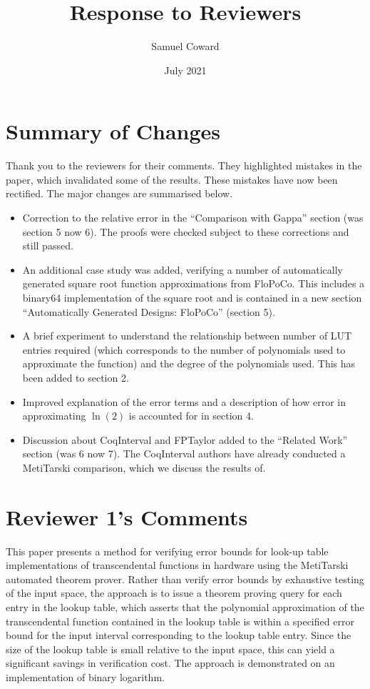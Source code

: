 \documentclass{article}
\title{Response to Reviewers}
\author{Samuel Coward }
\date{July 2021}
\begin{document}
\maketitle

\section*{Summary of Changes}
Thank you to the reviewers for their comments. They highlighted mistakes in the paper, which invalidated some of the results. These mistakes have now been rectified. The major changes are summarised below.

\begin{itemize}
    \item Correction to the relative error in the ``Comparison with Gappa'' section (was section 5 now 6). The proofs were checked subject to these corrections and still passed.
    \item An additional case study was added, verifying a number of automatically generated square root function approximations from FloPoCo. This includes a binary64 implementation of the square root and is contained in a new section ``Automatically Generated Designs: FloPoCo'' (section 5).
    \item A brief experiment to understand the relationship between number of LUT entries required (which corresponds to the number of polynomials used to approximate the function) and the degree of the polynomials used. This has been added to section 2.
    \item Improved explanation of the error terms and a description of how error in approximating $\ln(2)$ is accounted for in section 4. 
    \item Discussion about CoqInterval and FPTaylor added to the ``Related Work'' section (was 6 now 7). The CoqInterval authors have already conducted a MetiTarski comparison, which we discuss the results of.  
\end{itemize} 

\section*{Reviewer 1's Comments}
This paper presents a method for verifying error bounds for look-up table implementations of transcendental functions in hardware using the MetiTarski automated theorem prover.  Rather than verify error bounds by exhaustive testing of the input space, the approach is to issue a theorem proving query for each entry in the lookup table, which asserts that the polynomial approximation of the transcendental function contained in the lookup table is within a specified error bound for the input interval corresponding to the lookup table entry.  Since the size of the lookup table is small relative to the input space, this can yield a significant savings in verification cost.  The approach is demonstrated on an implementation of binary logarithm.
\end{document}
